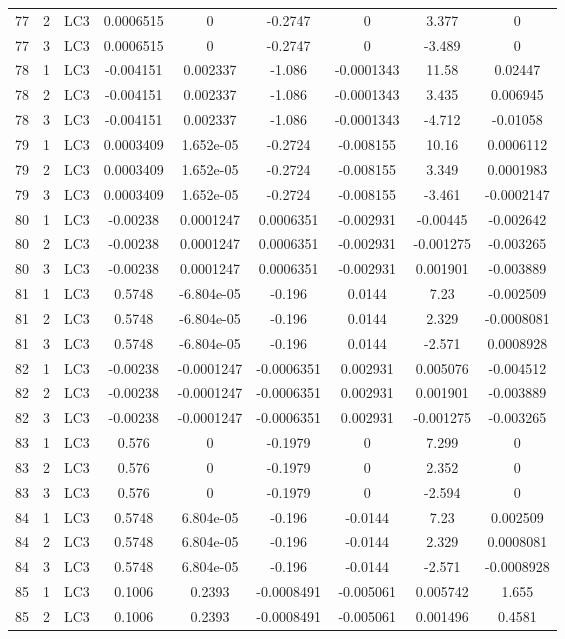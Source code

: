 \documentclass{article}%
\begin{document}
\begin{longtable}{| c c c | c c c c c c |}
77&2&LC3&0.0006515&0&{-}0.2747&0&3.377&0\\%
77&3&LC3&0.0006515&0&{-}0.2747&0&{-}3.489&0\\%
78&1&LC3&{-}0.004151&0.002337&{-}1.086&{-}0.0001343&11.58&0.02447\\%
78&2&LC3&{-}0.004151&0.002337&{-}1.086&{-}0.0001343&3.435&0.006945\\%
78&3&LC3&{-}0.004151&0.002337&{-}1.086&{-}0.0001343&{-}4.712&{-}0.01058\\%
79&1&LC3&0.0003409&1.652e{-}05&{-}0.2724&{-}0.008155&10.16&0.0006112\\%
79&2&LC3&0.0003409&1.652e{-}05&{-}0.2724&{-}0.008155&3.349&0.0001983\\%
79&3&LC3&0.0003409&1.652e{-}05&{-}0.2724&{-}0.008155&{-}3.461&{-}0.0002147\\%
80&1&LC3&{-}0.00238&0.0001247&0.0006351&{-}0.002931&{-}0.00445&{-}0.002642\\%
80&2&LC3&{-}0.00238&0.0001247&0.0006351&{-}0.002931&{-}0.001275&{-}0.003265\\%
80&3&LC3&{-}0.00238&0.0001247&0.0006351&{-}0.002931&0.001901&{-}0.003889\\%
81&1&LC3&0.5748&{-}6.804e{-}05&{-}0.196&0.0144&7.23&{-}0.002509\\%
81&2&LC3&0.5748&{-}6.804e{-}05&{-}0.196&0.0144&2.329&{-}0.0008081\\%
81&3&LC3&0.5748&{-}6.804e{-}05&{-}0.196&0.0144&{-}2.571&0.0008928\\%
82&1&LC3&{-}0.00238&{-}0.0001247&{-}0.0006351&0.002931&0.005076&{-}0.004512\\%
82&2&LC3&{-}0.00238&{-}0.0001247&{-}0.0006351&0.002931&0.001901&{-}0.003889\\%
82&3&LC3&{-}0.00238&{-}0.0001247&{-}0.0006351&0.002931&{-}0.001275&{-}0.003265\\%
83&1&LC3&0.576&0&{-}0.1979&0&7.299&0\\%
83&2&LC3&0.576&0&{-}0.1979&0&2.352&0\\%
83&3&LC3&0.576&0&{-}0.1979&0&{-}2.594&0\\%
84&1&LC3&0.5748&6.804e{-}05&{-}0.196&{-}0.0144&7.23&0.002509\\%
84&2&LC3&0.5748&6.804e{-}05&{-}0.196&{-}0.0144&2.329&0.0008081\\%
84&3&LC3&0.5748&6.804e{-}05&{-}0.196&{-}0.0144&{-}2.571&{-}0.0008928\\%
85&1&LC3&0.1006&0.2393&{-}0.0008491&{-}0.005061&0.005742&1.655\\%
85&2&LC3&0.1006&0.2393&{-}0.0008491&{-}0.005061&0.001496&0.4581\\%

\end{longtable}
\end{document}
